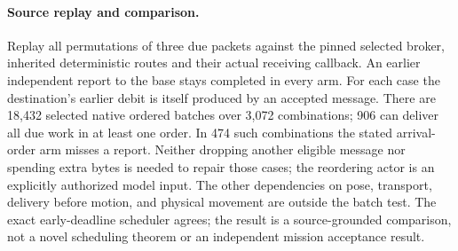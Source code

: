 \documentclass{article}
\begin{document}
\paragraph{Source replay and comparison.}
Replay all permutations of three due packets against the
pinned selected broker, inherited deterministic routes and
their actual receiving callback. An earlier independent
report to the base stays completed in every arm. For each
case the destination's earlier debit is itself produced by
an accepted message. There are 18,432 selected native
ordered batches over 3,072 combinations; 906 can deliver
all due work in at least one order. In 474 such combinations
the stated arrival-order arm misses a report. Neither
dropping another eligible message nor spending extra bytes
is needed to repair those cases; the reordering actor is
an explicitly authorized model input. The other
dependencies on pose, transport, delivery before motion, and
physical movement are outside the batch test. The exact
early-deadline scheduler agrees; the result is a source-grounded
comparison, not a novel scheduling theorem or an independent
mission acceptance result.
\end{document}
